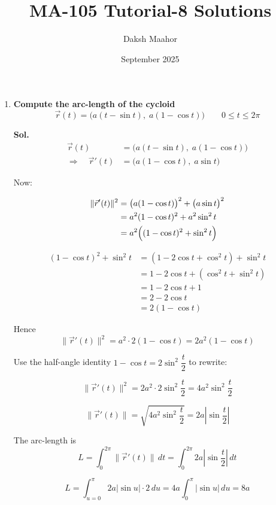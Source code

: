 \documentclass[14pt]{extarticle}
\title{\vspace{-3cm}MA-105 Tutorial-8 Solutions}
\author{Daksh Maahor}
\date{September 2025}
\begin{document}
\maketitle

\bigskip

\begin{enumerate}

\item \textbf{Compute the arc-length of the cycloid}
\[
\vec{r}(t) = \bigl(a(t-\sin t),\; a(1-\cos t)\bigr)\qquad 0\le t\le 2\pi
\]

\textbf{Sol.}
\begin{align*}
\vec{r}(t) &= \bigl(a(t-\sin t),\; a(1-\cos t)\bigr)\\
\Rightarrow\quad \vec{r}'(t) &= \bigl(a(1-\cos t),\; a\sin t\bigr)
\end{align*}

Now:

\begin{align*}
\|\vec{r}'(t)\|^2 
&= \bigl(a(1-\cos t)\bigr)^2 + \bigl(a\sin t\bigr)^2 \\
&= a^2(1-\cos t)^2 + a^2\sin^2 t \\
&= a^2\Bigl((1-\cos t)^2 + \sin^2 t\Bigr)
\end{align*}

\begin{align*}
(1-\cos t)^2 + \sin^2 t
&= (1 - 2\cos t + \cos^2 t) + \sin^2 t \\
&= 1 - 2\cos t + (\cos^2 t + \sin^2 t) \\
&= 1 - 2\cos t + 1 \\
&= 2 - 2\cos t \\
&= 2(1-\cos t)
\end{align*}

Hence
\[
\|\vec{r}'(t)\|^2 = a^2\cdot 2(1-\cos t) = 2a^2(1-\cos t)
\]

Use the half-angle identity $1-\cos t = 2\sin^2\!\dfrac{t}{2}$ to rewrite:

\[
\|\vec{r}'(t)\|^2 = 2a^2 \cdot 2\sin^2\!\frac{t}{2} = 4a^2 \sin^2\!\frac{t}{2}
\]

\[
\|\vec{r}'(t)\| = \sqrt{4a^2 \sin^2\!\frac{t}{2}} = 2a\left|\sin\frac{t}{2}\right|
\]

The arc-length is
\[
L=\int_{0}^{2\pi}\|\vec{r}'(t)\|\,dt
= \int_{0}^{2\pi} 2a\left|\sin\frac{t}{2}\right|\,dt
\]

\[
L = \int_{u=0}^{\pi} 2a \left|\sin u\right|\cdot 2\,du = 4a\int_{0}^{\pi} |\sin u|\,du = 8a
\]


\end{enumerate}
\end{document}
